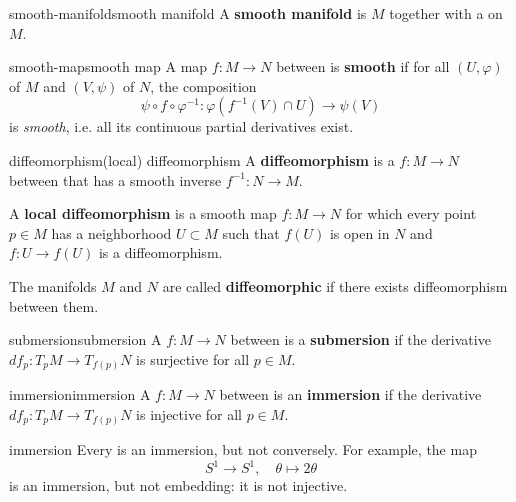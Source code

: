 \begin{topic}{smooth-manifold}{smooth manifold}
    A \textbf{smooth manifold} is  $M$ together with a  on $M$.
\end{topic}

\begin{topic}{smooth-map}{smooth map}
    A map $f : M \to N$ between  is \textbf{smooth} if for all  $(U, \varphi)$ of $M$ and $(V, \psi)$ of $N$, the composition
    \[ \psi \circ f \circ \varphi^{-1} : \varphi(f^{-1}(V) \cap U) \to \psi(V) \]
    is \textit{smooth}, i.e. all its continuous partial derivatives exist.
\end{topic}

\begin{topic}{diffeomorphism}{(local) diffeomorphism}
    A \textbf{diffeomorphism} is a  $f : M \to N$ between  that has a smooth inverse $f^{-1} : N \to M$.
    
    A \textbf{local diffeomorphism} is a smooth map $f : M \to N$ for which every point $p \in M$ has a neighborhood $U \subset M$ such that $f(U)$ is open in $N$ and $f : U \to f(U)$ is a diffeomorphism.
    
    The manifolds $M$ and $N$ are called \textbf{diffeomorphic} if there exists diffeomorphism between them.
\end{topic}

\begin{topic}{submersion}{submersion}
    A  $f : M \to N$ between  is a \textbf{submersion} if the derivative $df_p : T_p M \to T_{f(p)} N$ is surjective for all $p \in M$.
\end{topic}

\begin{topic}{immersion}{immersion}
    A  $f : M \to N$ between  is an \textbf{immersion} if the derivative $df_p : T_p M \to T_{f(p)} N$ is injective for all $p \in M$.
\end{topic}

\begin{example}{immersion}
    Every  is an immersion, but not conversely. For example, the map
    \[ S^1 \to S^1, \quad \theta \mapsto 2 \theta  \]
    is an immersion, but not embedding: it is not injective.
\end{example}

